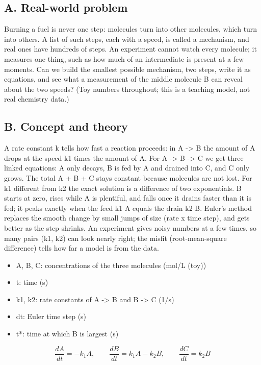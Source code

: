 \documentclass[11pt,a4paper]{article}
\begin{document}
\subsection*{A. Real-world problem}
Burning a fuel is never one step: molecules turn into other molecules, which turn into others. A list of such steps, each with a speed, is called a mechanism, and real ones have hundreds of steps. An experiment cannot watch every molecule; it measures one thing, such as how much of an intermediate is present at a few moments. Can we build the smallest possible mechanism, two steps, write it as equations, and see what a measurement of the middle molecule B can reveal about the two speeds? (Toy numbers throughout; this is a teaching model, not real chemistry data.)

\subsection*{B. Concept and theory}
A rate constant k tells how fast a reaction proceeds: in A -\textgreater{} B the amount of A drops at the speed k1 times the amount of A. For A -\textgreater{} B -\textgreater{} C we get three linked equations: A only decays, B is fed by A and drained into C, and C only grows. The total A + B + C stays constant because molecules are not lost. For k1 different from k2 the exact solution is a difference of two exponentials. B starts at zero, rises while A is plentiful, and falls once it drains faster than it is fed; it peaks exactly when the feed k1 A equals the drain k2 B. Euler's method replaces the smooth change by small jumps of size (rate x time step), and gets better as the step shrinks. An experiment gives noisy numbers at a few times, so many pairs (k1, k2) can look nearly right; the misfit (root-mean-square difference) tells how far a model is from the data.

\begin{itemize}[nosep]
\item A, B, C: concentrations of the three molecules (mol/L (toy))
\item t: time (s)
\item k1, k2: rate constants of A -\textgreater{} B and B -\textgreater{} C (1/s)
\item dt: Euler time step (s)
\item t*: time at which B is largest (s)
\end{itemize}

\begin{equation*}
\frac{dA}{dt}=-k_1A,\qquad \frac{dB}{dt}=k_1A-k_2B,\qquad \frac{dC}{dt}=k_2B
\end{equation*}
\end{document}
